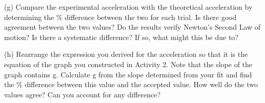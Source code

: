 (g) Compare the experimental acceleration with the theoretical acceleration
by determining the \% difference between the two for each trial. Is there good
agreement between the two values? Do the results verify Newton's Second Law
of motion? Is there a systematic difference? If so, what might this be due to?
\vspace{20mm}

(h) Rearrange the expression you derived for the acceleration so that it is
the equation of the graph you constructed in Activity 2. Note that the slope
of the graph contains g. Calculate g from the slope determined from your fit
and find the \% difference between this value and the accepted value. How well
do the two values agree? Can you account for any difference?


